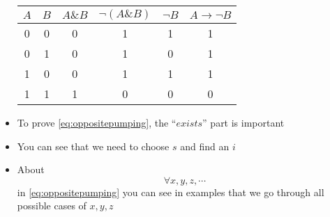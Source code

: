 \begin{frame}[allowframebreaks]
\begin{itemize}
\begin{center}
  \begin{tabular}{cc|cc|cc}
    $A$ & $B$ & $A \& B$ & $\neg(A\& B)$ & $\neg B$ & $A \rightarrow \neg B$ \\ \hline
    0& 0 &0 & 1 & 1& 1\\ 
    0& 1 &0 & 1 & 0& 1\\
    1& 0 &0 & 1 & 1& 1\\
    1& 1 &1 & 0 & 0& 0
  \end{tabular}
\end{center}
\item To prove \eqref{eq:oppositepumping}, the ``$exists$'' part
  is important
\item You can see that we need to choose $s$ and find an $i$
\item About
  \begin{equation*}
    \forall x, y, z, \cdots
  \end{equation*}
  in \eqref{eq:oppositepumping} you can see in examples that we go through
  all possible cases of $x, y, z$
  





\end{itemize}\end{frame}


